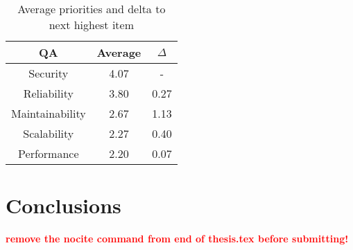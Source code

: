 \documentclass[utf8,english]{gradu3}
\newcommand{\todo}[1]{\textbf{\textcolor{red}{#1}}}
\begin{document}
\begin{table}[!h]
  \begin{center}
    \caption{Average priorities and delta to next highest item}
    \label{table:priorities3}
    \begin{tabular}{|c|c|c|}
      \hline
      \textbf{QA}     & \textbf{Average} & \textbf{$\Delta$} \\
      \hline
      Security        & 4.07             & -                 \\
      Reliability     & 3.80             & 0.27              \\
      Maintainability & 2.67             & 1.13              \\
      Scalability     & 2.27             & 0.40              \\
      Performance     & 2.20             & 0.07              \\
      \hline
    \end{tabular}
  \end{center}
\end{table}

\chapter{Conclusions}
\label{chapter:conclusions}


\printbibliography

\nocite{*}
\todo{remove the nocite command from end of thesis.tex before submitting!}

\appendix
\end{document}
